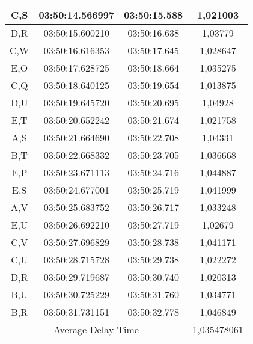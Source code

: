 \begin{table}[!ht]
\begin{tabular}{|ccc|c|}
  \multicolumn{1}{|c|}{C,S}  & \multicolumn{1}{c|}{03:50:14.566997} & 03:50:15.588       & 1,021003    \\ \hline
  \multicolumn{1}{|c|}{D,R}  & \multicolumn{1}{c|}{03:50:15.600210} & 03:50:16.638       & 1,03779     \\ \hline
  \multicolumn{1}{|c|}{C,W}  & \multicolumn{1}{c|}{03:50:16.616353} & 03:50:17.645       & 1,028647    \\ \hline
  \multicolumn{1}{|c|}{E,O}  & \multicolumn{1}{c|}{03:50:17.628725} & 03:50:18.664       & 1,035275    \\ \hline
  \multicolumn{1}{|c|}{C,Q}  & \multicolumn{1}{c|}{03:50:18.640125} & 03:50:19.654       & 1,013875    \\ \hline
  \multicolumn{1}{|c|}{D,U}  & \multicolumn{1}{c|}{03:50:19.645720} & 03:50:20.695       & 1,04928     \\ \hline
  \multicolumn{1}{|c|}{E,T}  & \multicolumn{1}{c|}{03:50:20.652242} & 03:50:21.674       & 1,021758    \\ \hline
  \multicolumn{1}{|c|}{A,S}  & \multicolumn{1}{c|}{03:50:21.664690} & 03:50:22.708       & 1,04331     \\ \hline
  \multicolumn{1}{|c|}{B,T}  & \multicolumn{1}{c|}{03:50:22.668332} & 03:50:23.705       & 1,036668    \\ \hline
  \multicolumn{1}{|c|}{E,P}  & \multicolumn{1}{c|}{03:50:23.671113} & 03:50:24.716       & 1,044887    \\ \hline
  \multicolumn{1}{|c|}{E,S}  & \multicolumn{1}{c|}{03:50:24.677001} & 03:50:25.719       & 1,041999    \\ \hline
  \multicolumn{1}{|c|}{A,V}  & \multicolumn{1}{c|}{03:50:25.683752} & 03:50:26.717       & 1,033248    \\ \hline
  \multicolumn{1}{|c|}{E,U}  & \multicolumn{1}{c|}{03:50:26.692210} & 03:50:27.719       & 1,02679     \\ \hline
  \multicolumn{1}{|c|}{C,V}  & \multicolumn{1}{c|}{03:50:27.696829} & 03:50:28.738       & 1,041171    \\ \hline
  \multicolumn{1}{|c|}{C,U}  & \multicolumn{1}{c|}{03:50:28.715728} & 03:50:29.738       & 1,022272    \\ \hline
  \multicolumn{1}{|c|}{D,R}  & \multicolumn{1}{c|}{03:50:29.719687} & 03:50:30.740       & 1,020313    \\ \hline
  \multicolumn{1}{|c|}{B,U}  & \multicolumn{1}{c|}{03:50:30.725229} & 03:50:31.760       & 1,034771    \\ \hline
  \multicolumn{1}{|c|}{B,R}  & \multicolumn{1}{c|}{03:50:31.731151} & 03:50:32.778       & 1,046849    \\ \hline
  \multicolumn{3}{|c|}{Average Delay Time}                                               & 1,035478061 \\ \hline
  \end{tabular}
\end{table}

